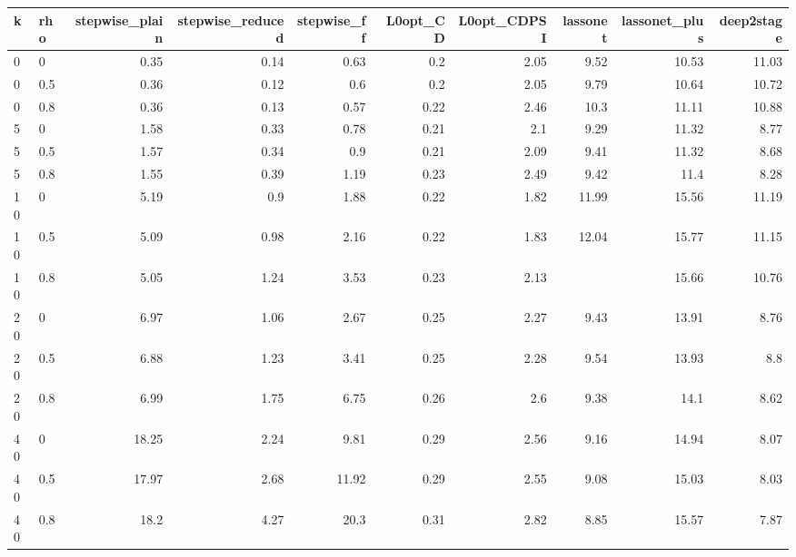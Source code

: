 \begin{tabular}{llrrrrrrrr}
\toprule
k & rho & stepwise\_plain & stepwise\_reduced & stepwise\_ff & L0opt\_CD & L0opt\_CDPSI & lassonet & lassonet\_plus & deep2stage \\
\midrule
0 & 0 & 0.35 & 0.14 & 0.63 & 0.2 & 2.05 & 9.52 & 10.53 & 11.03 \\
0 & 0.5 & 0.36 & 0.12 & 0.6 & 0.2 & 2.05 & 9.79 & 10.64 & 10.72 \\
0 & 0.8 & 0.36 & 0.13 & 0.57 & 0.22 & 2.46 & 10.3 & 11.11 & 10.88 \\
5 & 0 & 1.58 & 0.33 & 0.78 & 0.21 & 2.1 & 9.29 & 11.32 & 8.77 \\
5 & 0.5 & 1.57 & 0.34 & 0.9 & 0.21 & 2.09 & 9.41 & 11.32 & 8.68 \\
5 & 0.8 & 1.55 & 0.39 & 1.19 & 0.23 & 2.49 & 9.42 & 11.4 & 8.28 \\
10 & 0 & 5.19 & 0.9 & 1.88 & 0.22 & 1.82 & 11.99 & 15.56 & 11.19 \\
10 & 0.5 & 5.09 & 0.98 & 2.16 & 0.22 & 1.83 & 12.04 & 15.77 & 11.15 \\
10 & 0.8 & 5.05 & 1.24 & 3.53 & 0.23 & 2.13 &  & 15.66 & 10.76 \\
20 & 0 & 6.97 & 1.06 & 2.67 & 0.25 & 2.27 & 9.43 & 13.91 & 8.76 \\
20 & 0.5 & 6.88 & 1.23 & 3.41 & 0.25 & 2.28 & 9.54 & 13.93 & 8.8 \\
20 & 0.8 & 6.99 & 1.75 & 6.75 & 0.26 & 2.6 & 9.38 & 14.1 & 8.62 \\
40 & 0 & 18.25 & 2.24 & 9.81 & 0.29 & 2.56 & 9.16 & 14.94 & 8.07 \\
40 & 0.5 & 17.97 & 2.68 & 11.92 & 0.29 & 2.55 & 9.08 & 15.03 & 8.03 \\
40 & 0.8 & 18.2 & 4.27 & 20.3 & 0.31 & 2.82 & 8.85 & 15.57 & 7.87 \\
\bottomrule
\end{tabular}
